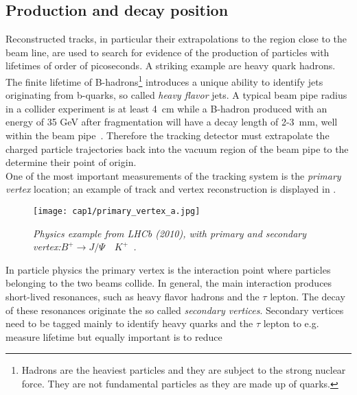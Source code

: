 \subsection{Production and decay position}\label{Production and decay position}

Reconstructed tracks, in particular their extrapolations to the region close to
the beam line, are used to search for evidence of the production of particles
with lifetimes of order of picoseconds.
A striking example are heavy quark hadrons. The finite lifetime of
B-hadrons\footnote{Hadrons are the heaviest particles and they are subject to
  the strong nuclear force. They are not fundamental particles as they are made
  up of quarks.} introduces a unique ability to identify jets originating from
b-quarks, so called {\it heavy flavor} jets. A typical beam pipe radius in a
collider experiment is at least 4~cm while a B-hadron produced with an energy of
35 GeV after fragmentation will have a decay length of 2-3~mm, well within the
beam pipe~\cite{Tully}. Therefore the tracking detector must extrapolate the
charged particle trajectories back into the vacuum region of the beam pipe to
the determine their point of origin.
\\
One of the most important measurements of the tracking system is the {\it
  primary vertex} location; an example of track and vertex reconstruction is
displayed in .
\begin{figure}[!htbp]
  \centering\texttt{[image: cap1/primary\_vertex\_a.jpg]}
  \caption{\textit{Physics example from LHCb (2010), with primary and secondary
      vertex:\quad $B^{+} \to J/\Psi\quad K^{+}$~\cite{Moll}.}}\label{Moll_1}
\end{figure}
In particle physics the primary vertex is the interaction point where particles
belonging to the two beams collide.  In general, the main interaction produces
short-lived resonances, such as heavy flavor hadrons and the $\tau$ lepton. The
decay of these resonances originate the so called {\it secondary vertices}.
Secondary vertices need to be tagged mainly to identify heavy quarks and the
$\tau$ lepton to e.g. measure lifetime but equally important is to reduce
